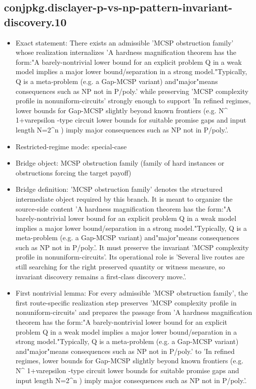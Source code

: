 \documentclass[11pt]{article}
\begin{document}
\subsection*{conjpkg.disclayer-p-vs-np-pattern-invariant-discovery.10}
\begin{itemize}
\item Exact statement: There exists an admissible 'MCSP obstruction family' whose realization internalizes 'A hardness magnification theorem has the form:"A barely-nontrivial lower bound for an explicit problem Q in a weak model implies a major lower bound/separation in a strong model."Typically, Q is a meta-problem (e.g. a Gap-MCSP variant) and"major"means consequences such as NP not in P/poly.' while preserving 'MCSP complexity profile in nonuniform-circuits' strongly enough to support 'In refined regimes, lower bounds for Gap-MCSP slightly beyond known frontiers (e.g. N\textasciicircum{} 1+varepsilon -type circuit lower bounds for suitable promise gaps and input length N=2\textasciicircum{}n ) imply major consequences such as NP not in P/poly.'.
\item Restricted-regime mode: special-case
\item Bridge object: MCSP obstruction family (family of hard instances or obstructions forcing the target payoff)
\item Bridge definition: 'MCSP obstruction family' denotes the structured intermediate object required by this branch. It is meant to organize the source-side content 'A hardness magnification theorem has the form:"A barely-nontrivial lower bound for an explicit problem Q in a weak model implies a major lower bound/separation in a strong model."Typically, Q is a meta-problem (e.g. a Gap-MCSP variant) and"major"means consequences such as NP not in P/poly.'. It must preserve the invariant 'MCSP complexity profile in nonuniform-circuits'. Its operational role is 'Several live routes are still searching for the right preserved quantity or witness measure, so invariant discovery remains a first-class discovery move.'.
\item First nontrivial lemma: For every admissible 'MCSP obstruction family', the first route-specific realization step preserves 'MCSP complexity profile in nonuniform-circuits' and prepares the passage from 'A hardness magnification theorem has the form:"A barely-nontrivial lower bound for an explicit problem Q in a weak model implies a major lower bound/separation in a strong model."Typically, Q is a meta-problem (e.g. a Gap-MCSP variant) and"major"means consequences such as NP not in P/poly.' to 'In refined regimes, lower bounds for Gap-MCSP slightly beyond known frontiers (e.g. N\textasciicircum{} 1+varepsilon -type circuit lower bounds for suitable promise gaps and input length N=2\textasciicircum{}n ) imply major consequences such as NP not in P/poly.'.

\end{itemize}
\end{document}
